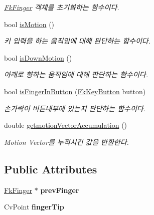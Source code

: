 \begin{DoxyCompactItemize}
\begin{DoxyCompactList}\small\item\em \hyperlink{class_fk_finger}{Fk\+Finger} 객체를 초기화하는 함수이다. \end{DoxyCompactList}\item 
\hypertarget{class_fk_finger_a5127207cf4aac10ccdf08a5f3992e36d}{}bool \hyperlink{class_fk_finger_a5127207cf4aac10ccdf08a5f3992e36d}{is\+Motion} ()\label{class_fk_finger_a5127207cf4aac10ccdf08a5f3992e36d}

\begin{DoxyCompactList}\small\item\em 키 입력을 하는 움직임에 대해 판단하는 함수이다. \end{DoxyCompactList}\item 
\hypertarget{class_fk_finger_a7e57ca7e4fab4b67e402b2c5ca104411}{}bool \hyperlink{class_fk_finger_a7e57ca7e4fab4b67e402b2c5ca104411}{is\+Down\+Motion} ()\label{class_fk_finger_a7e57ca7e4fab4b67e402b2c5ca104411}

\begin{DoxyCompactList}\small\item\em 아래로 향하는 움직임에 대해 판단하는 함수이다. \end{DoxyCompactList}\item 
\hypertarget{class_fk_finger_adc3146ffa7844227ca2e95af38b4f003}{}bool \hyperlink{class_fk_finger_adc3146ffa7844227ca2e95af38b4f003}{is\+Finger\+In\+Button} (\hyperlink{class_fk_key_button}{Fk\+Key\+Button} button)\label{class_fk_finger_adc3146ffa7844227ca2e95af38b4f003}

\begin{DoxyCompactList}\small\item\em 손가락이 버튼내부에 있는지 판단하는 함수이다. \end{DoxyCompactList}\item 
\hypertarget{class_fk_finger_a3f898b85da60b5742f3df806fe1f6447}{}double \hyperlink{class_fk_finger_a3f898b85da60b5742f3df806fe1f6447}{getmotion\+Vector\+Accumulation} ()\label{class_fk_finger_a3f898b85da60b5742f3df806fe1f6447}

\begin{DoxyCompactList}\small\item\em Motion Vector를 누적시킨 값을 반환한다. \end{DoxyCompactList}\end{DoxyCompactItemize}
\subsection*{Public Attributes}
\begin{DoxyCompactItemize}
\item 
\hypertarget{class_fk_finger_aeff411ac50ba415c7d27101132dc20f1}{}\hyperlink{class_fk_finger}{Fk\+Finger} $\ast$ {\bfseries prev\+Finger}\label{class_fk_finger_aeff411ac50ba415c7d27101132dc20f1}

\item 
\hypertarget{class_fk_finger_a7c18ea7557982731ff2cd8e61343fcb9}{}Cv\+Point {\bfseries finger\+Tip}\label{class_fk_finger_a7c18ea7557982731ff2cd8e61343fcb9}

\end{DoxyCompactItemize}


